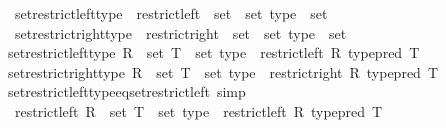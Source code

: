 \begin{isabellebody}
\isanewline
{}\isamarkupfalse%
\isanewline
\ \ set{\isacharunderscore}{\kern0pt}restrict{\isacharunderscore}{\kern0pt}left{\isacharunderscore}{\kern0pt}type\ {\isasymequiv}\ {\isachardoublequoteopen}restrict{\isacharunderscore}{\kern0pt}left\ {\isacharcolon}{\kern0pt}{\isacharcolon}{\kern0pt}\ set\ {\isasymRightarrow}\ set\ type\ {\isasymRightarrow}\ set{\isachardoublequoteclose}\isanewline
\ \ set{\isacharunderscore}{\kern0pt}restrict{\isacharunderscore}{\kern0pt}right{\isacharunderscore}{\kern0pt}type\ {\isasymequiv}\ {\isachardoublequoteopen}restrict{\isacharunderscore}{\kern0pt}right\ {\isacharcolon}{\kern0pt}{\isacharcolon}{\kern0pt}\ set\ {\isasymRightarrow}\ set\ type\ {\isasymRightarrow}\ set{\isachardoublequoteclose}\isanewline
{}\isanewline
\ \ \isamarkupfalse%
\ {\isachardoublequoteopen}set{\isacharunderscore}{\kern0pt}restrict{\isacharunderscore}{\kern0pt}left{\isacharunderscore}{\kern0pt}type\ {\isacharparenleft}{\kern0pt}R\ {\isacharcolon}{\kern0pt}{\isacharcolon}{\kern0pt}\ set{\isacharparenright}{\kern0pt}\ {\isacharparenleft}{\kern0pt}T\ {\isacharcolon}{\kern0pt}{\isacharcolon}{\kern0pt}\ set\ type{\isacharparenright}{\kern0pt}\ {\isasymequiv}\ restrict{\isacharunderscore}{\kern0pt}left\ R\ {\isacharparenleft}{\kern0pt}type{\isacharunderscore}{\kern0pt}pred\ T{\isacharparenright}{\kern0pt}{\isachardoublequoteclose}\isanewline
\ \ \isamarkupfalse%
\ {\isachardoublequoteopen}set{\isacharunderscore}{\kern0pt}restrict{\isacharunderscore}{\kern0pt}right{\isacharunderscore}{\kern0pt}type\ {\isacharparenleft}{\kern0pt}R\ {\isacharcolon}{\kern0pt}{\isacharcolon}{\kern0pt}\ set{\isacharparenright}{\kern0pt}\ {\isacharparenleft}{\kern0pt}T\ {\isacharcolon}{\kern0pt}{\isacharcolon}{\kern0pt}\ set\ type{\isacharparenright}{\kern0pt}\ {\isasymequiv}\ restrict{\isacharunderscore}{\kern0pt}right\ R\ {\isacharparenleft}{\kern0pt}type{\isacharunderscore}{\kern0pt}pred\ T{\isacharparenright}{\kern0pt}{\isachardoublequoteclose}\isanewline
{}\isamarkupfalse%
\isanewline
\isanewline
{}\isamarkupfalse%
\ set{\isacharunderscore}{\kern0pt}restrict{\isacharunderscore}{\kern0pt}left{\isacharunderscore}{\kern0pt}type{\isacharunderscore}{\kern0pt}eq{\isacharunderscore}{\kern0pt}set{\isacharunderscore}{\kern0pt}restrict{\isacharunderscore}{\kern0pt}left\ {\isacharbrackleft}{\kern0pt}simp{\isacharbrackright}{\kern0pt}{\isacharcolon}{\kern0pt}\isanewline
\ \ {\isachardoublequoteopen}restrict{\isacharunderscore}{\kern0pt}left\ {\isacharparenleft}{\kern0pt}R\ {\isacharcolon}{\kern0pt}{\isacharcolon}{\kern0pt}\ set{\isacharparenright}{\kern0pt}\ {\isacharparenleft}{\kern0pt}T\ {\isacharcolon}{\kern0pt}{\isacharcolon}{\kern0pt}\ set\ type{\isacharparenright}{\kern0pt}\ {\isacharequal}{\kern0pt}\ restrict{\isacharunderscore}{\kern0pt}left\ R\ {\isacharparenleft}{\kern0pt}type{\isacharunderscore}{\kern0pt}pred\ T{\isacharparenright}{\kern0pt}{\isachardoublequoteclose}\isanewline

\end{isabellebody}

